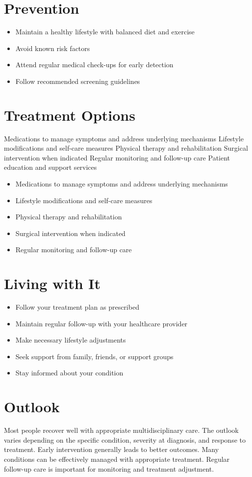 \section{Prevention}
\begin{itemize}[noitemsep]
  \item Maintain a healthy lifestyle with balanced diet and exercise
  \item Avoid known risk factors
  \item Attend regular medical check-ups for early detection
  \item Follow recommended screening guidelines
\end{itemize}
\section{Treatment Options}
Medications to manage symptoms and address underlying mechanisms Lifestyle modifications and self-care measures Physical therapy and rehabilitation Surgical intervention when indicated Regular monitoring and follow-up care Patient education and support services

\begin{itemize}[noitemsep]
  \item Medications to manage symptoms and address underlying mechanisms
  \item Lifestyle modifications and self-care measures
  \item Physical therapy and rehabilitation
  \item Surgical intervention when indicated
  \item Regular monitoring and follow-up care
\end{itemize}
\section{Living with It}
\begin{itemize}[noitemsep]
  \item Follow your treatment plan as prescribed
  \item Maintain regular follow-up with your healthcare provider
  \item Make necessary lifestyle adjustments
  \item Seek support from family, friends, or support groups
  \item Stay informed about your condition
\end{itemize}
\section{Outlook}
Most people recover well with appropriate multidisciplinary care. The outlook varies depending on the specific condition, severity at diagnosis, and response to treatment. Early intervention generally leads to better outcomes. Many conditions can be effectively managed with appropriate treatment. Regular follow-up care is important for monitoring and treatment adjustment.

